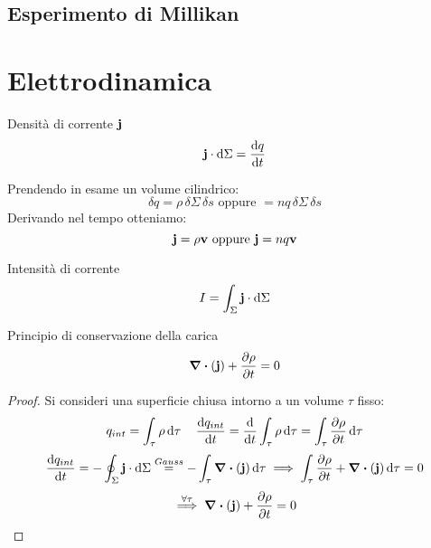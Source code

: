 \documentclass[12pt,a4paper]{article}
\begin{document}
\subsection{Esperimento di Millikan}






\section{Elettrodinamica}

\begin{definition}
    Densità di corrente $\vb{j}$
    \begin{equation*}
        \vb{j}\cdot\dd{\Sigma}= \dv{q}{t}
    \end{equation*}
\end{definition}
Prendendo in esame un volume cilindrico:
\begin{equation*}
    \delta q = \rho\,\delta\Sigma\,\delta s \text{  oppure  } =  n q \,\delta\Sigma\,\delta s
\end{equation*}
Derivando nel tempo otteniamo:
\begin{equation*}
    \vb{j}= \rho\vb{v} \text{  oppure  } \vb{j}= nq\vb{v}
\end{equation*}
\begin{definition}
    Intensità di corrente
    \begin{equation*}
        I = \int_\Sigma \vb{j}\cdot\dd{\Sigma}
    \end{equation*}
\end{definition}

\begin{theorem}
    Principio di conservazione della carica
    \begin{equation*}
        \div(\vb{j})+\pdv{\rho}{t}=0
    \end{equation*}
\end{theorem}
\begin{proof}
    Si consideri una superficie chiusa intorno a un volume $\tau$ fisso:
    \begin{equation*}
        q_{int}= \int_\tau\rho\dd{\tau} \quad \dv{q_{int}}{t}= \dv{}{t}\int_\tau \rho\dd{\tau} = \int_\tau \pdv{\rho}{t}\dd{\tau}
    \end{equation*}
    \begin{equation*}
        \dv{q_{int}}{t}= - \oint_\Sigma \vb{j}\cdot\dd{\Sigma}\overset{Gauss}{=}-\int_\tau \div(\vb{j})\dd{\tau}\implies
        \int_\tau \pdv{\rho}{t} + \div(\vb{j}) \dd{\tau}= 0
    \end{equation*}
    \begin{equation*}
        \overset{\forall\tau}{\implies} \div(\vb{j})+ \pdv{\rho}{t}=0
    \end{equation*}

\end{proof}
\end{document}
